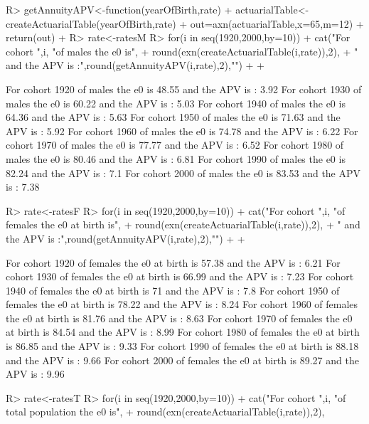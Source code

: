 \documentclass[nojss]{jss}
\begin{document}
\begin{Schunk}
\begin{Sinput}
R> 	getAnnuityAPV<-function(yearOfBirth,rate) {
+ 		actuarialTable<-createActuarialTable(yearOfBirth,rate)
+ 		out=axn(actuarialTable,x=65,m=12)
+ 		return(out)
+ 	}
R> rate<-ratesM
R> for(i in seq(1920,2000,by=10)) {
+ 		cat("For cohort ",i, "of males the e0 is",
+ 		round(exn(createActuarialTable(i,rate)),2),
+ 		" and the APV is :",round(getAnnuityAPV(i,rate),2),"\n")
+ 		
+ 	}
\end{Sinput}
\begin{Soutput}
For cohort  1920 of males the e0 is 48.55  and the APV is : 3.92 
For cohort  1930 of males the e0 is 60.22  and the APV is : 5.03 
For cohort  1940 of males the e0 is 64.36  and the APV is : 5.63 
For cohort  1950 of males the e0 is 71.63  and the APV is : 5.92 
For cohort  1960 of males the e0 is 74.78  and the APV is : 6.22 
For cohort  1970 of males the e0 is 77.77  and the APV is : 6.52 
For cohort  1980 of males the e0 is 80.46  and the APV is : 6.81 
For cohort  1990 of males the e0 is 82.24  and the APV is : 7.1 
For cohort  2000 of males the e0 is 83.53  and the APV is : 7.38 
\end{Soutput}
\begin{Sinput}
R> rate<-ratesF
R> for(i in seq(1920,2000,by=10)) {
+   	cat("For cohort ",i, "of females the e0 at birth is",
+ 	round(exn(createActuarialTable(i,rate)),2),
+ 	" and the APV is :",round(getAnnuityAPV(i,rate),2),"\n")
+ 		
+ 	}
\end{Sinput}
\begin{Soutput}
For cohort  1920 of females the e0 at birth is 57.38  and the APV is : 6.21 
For cohort  1930 of females the e0 at birth is 66.99  and the APV is : 7.23 
For cohort  1940 of females the e0 at birth is 71  and the APV is : 7.8 
For cohort  1950 of females the e0 at birth is 78.22  and the APV is : 8.24 
For cohort  1960 of females the e0 at birth is 81.76  and the APV is : 8.63 
For cohort  1970 of females the e0 at birth is 84.54  and the APV is : 8.99 
For cohort  1980 of females the e0 at birth is 86.85  and the APV is : 9.33 
For cohort  1990 of females the e0 at birth is 88.18  and the APV is : 9.66 
For cohort  2000 of females the e0 at birth is 89.27  and the APV is : 9.96 
\end{Soutput}
\begin{Sinput}
R> rate<-ratesT
R> for(i in seq(1920,2000,by=10)) {
+     cat("For cohort ",i, "of total population the e0 is",
+ 		round(exn(createActuarialTable(i,rate)),2),
}
\end{Sinput}
\end{Schunk}
\end{document}

